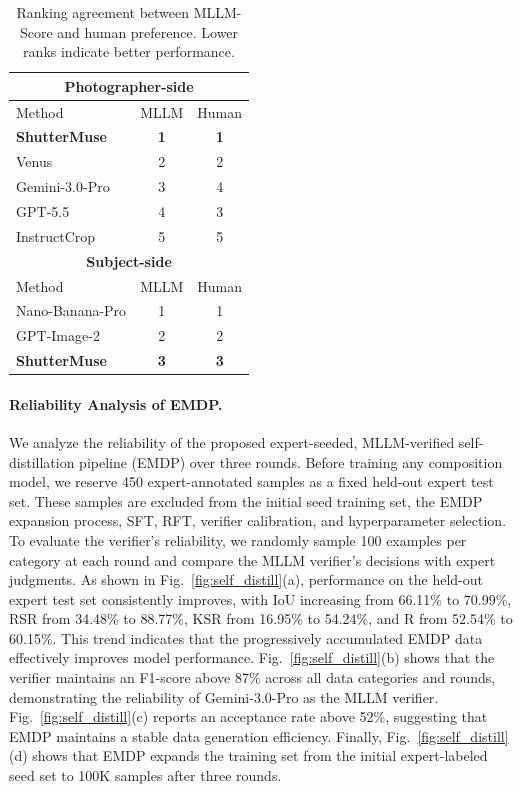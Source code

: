 \documentclass{llmxive}
\begin{document}
\begin{table}[t]
\vspace{-2.0em}
\centering
\scriptsize
\setlength{\tabcolsep}{3pt}
\begin{tabular}{@{}lcc@{}}
\toprule
\multicolumn{3}{c}{\textbf{Photographer-side}} \\
\midrule
Method & MLLM & Human \\
\midrule
\rowcolor{myblue}\textbf{ShutterMuse} & \textbf{1} & \textbf{1} \\
Venus & 2 & 2 \\
Gemini-3.0-Pro & 3 & 4 \\
GPT-5.5 & 4 & 3 \\
InstructCrop & 5 & 5 \\
\midrule
\midrule
\multicolumn{3}{c}{\textbf{Subject-side}} \\
\midrule
Method & MLLM & Human \\
Nano-Banana-Pro & 1 & 1 \\
GPT-Image-2 & 2 & 2 \\
\rowcolor{myblue}\textbf{ShutterMuse} & \textbf{3} & \textbf{3} \\
\bottomrule
\end{tabular}

\caption{
Ranking agreement between MLLM-Score and human preference. Lower ranks indicate better performance.
}
\label{tab:user_study_rankings}
\end{table}
\paragraph{Reliability Analysis of EMDP.}
We analyze the reliability of the proposed expert-seeded, MLLM-verified self-distillation pipeline (EMDP) over three rounds. Before training any composition model, we reserve 450 expert-annotated
samples as a fixed held-out expert test set. These samples are excluded from the initial seed training
set, the EMDP expansion process, SFT, RFT, verifier calibration, and hyperparameter selection. To evaluate the verifier's reliability, we randomly sample 100 examples per category at each round and compare the MLLM verifier's decisions with expert judgments. As shown in Fig.~\ref{fig:self_distill}(a), performance on the held-out expert test set consistently improves, with IoU increasing from 66.11\% to 70.99\%, RSR from 34.48\% to 88.77\%, KSR from 16.95\% to 54.24\%, and R from 52.54\% to 60.15\%. This trend indicates that the progressively accumulated EMDP data effectively improves model performance. 
Fig.~\ref{fig:self_distill}(b) shows that the verifier maintains an F1-score above 87\% across all data categories and rounds, demonstrating the reliability of Gemini-3.0-Pro as the MLLM verifier. Fig.~\ref{fig:self_distill}(c) reports an acceptance rate above 52\%, suggesting that EMDP maintains a stable data generation efficiency. Finally, Fig.~\ref{fig:self_distill}(d) shows that EMDP expands the training set from the initial expert-labeled seed set to 100K samples after three rounds.
\end{document}
